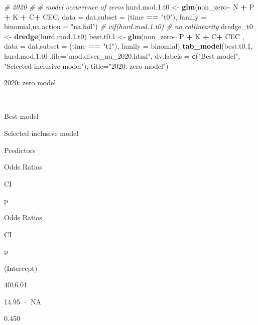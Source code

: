 \documentclass[
]{article}
\newenvironment{Shaded}{\begin{snugshade}}{\end{snugshade}}
\newcommand{\AttributeTok}[1]{\textcolor[rgb]{0.13,0.29,0.53}{#1}}
\newcommand{\CommentTok}[1]{\textcolor[rgb]{0.56,0.35,0.01}{\textit{#1}}}
\newcommand{\FloatTok}[1]{\textcolor[rgb]{0.00,0.00,0.81}{#1}}
\newcommand{\FunctionTok}[1]{\textcolor[rgb]{0.13,0.29,0.53}{\textbf{#1}}}
\newcommand{\NormalTok}[1]{#1}
\newcommand{\OtherTok}[1]{\textcolor[rgb]{0.56,0.35,0.01}{#1}}
\newcommand{\SpecialCharTok}[1]{\textcolor[rgb]{0.81,0.36,0.00}{\textbf{#1}}}
\newcommand{\StringTok}[1]{\textcolor[rgb]{0.31,0.60,0.02}{#1}}
\begin{document}
\begin{Shaded}
\begin{Highlighting}[]
\CommentTok{\# 2020 \#}
\CommentTok{\# model occurrence of zeros}
\NormalTok{hurd.mod.}\FloatTok{1.}\NormalTok{t0 }\OtherTok{\textless{}{-}} \FunctionTok{glm}\NormalTok{(non\_zero}\SpecialCharTok{\textasciitilde{}}\NormalTok{ N }\SpecialCharTok{+}\NormalTok{ P }\SpecialCharTok{+}\NormalTok{ K }\SpecialCharTok{+}\NormalTok{ C}\SpecialCharTok{+}\NormalTok{ CEC, }\AttributeTok{data =}\NormalTok{ dat,}\AttributeTok{subset =}\NormalTok{ (time }\SpecialCharTok{==} \StringTok{"t0"}\NormalTok{), }\AttributeTok{family =}\NormalTok{ binomial,}\AttributeTok{na.action =} \StringTok{"na.fail"}\NormalTok{)}
\CommentTok{\# vif(hurd.mod.1.t0) \# no collinearity}
\NormalTok{dredge\_t0 }\OtherTok{\textless{}{-}} \FunctionTok{dredge}\NormalTok{(hurd.mod.}\FloatTok{1.}\NormalTok{t0)}
\NormalTok{best.t0}\FloatTok{.1} \OtherTok{\textless{}{-}} \FunctionTok{glm}\NormalTok{(non\_zero}\SpecialCharTok{\textasciitilde{}}\NormalTok{ P }\SpecialCharTok{+}\NormalTok{ K }\SpecialCharTok{+}\NormalTok{ C}\SpecialCharTok{+}\NormalTok{ CEC , }\AttributeTok{data =}\NormalTok{ dat,}\AttributeTok{subset =}\NormalTok{ (time }\SpecialCharTok{==} \StringTok{"t1"}\NormalTok{), }\AttributeTok{family =}\NormalTok{ binomial)}
\FunctionTok{tab\_model}\NormalTok{(best.t0}\FloatTok{.1}\NormalTok{, hurd.mod.}\FloatTok{1.}\NormalTok{t0 ,}\AttributeTok{file=}\StringTok{"mod.diver\_nu\_2020.html"}\NormalTok{, }\AttributeTok{dv.labels =} \FunctionTok{c}\NormalTok{(}\StringTok{"Best model"}\NormalTok{, }\StringTok{"Selected inclusive model"}\NormalTok{), }\AttributeTok{title=}\StringTok{"2020: zero model"}\NormalTok{)}
\end{Highlighting}
\end{Shaded}

2020: zero model

~

Best model

Selected inclusive model

Predictors

Odds Ratios

CI

p

Odds Ratios

CI

p

(Intercept)

4016.01

14.95~--~NA

0.450
\end{document}
